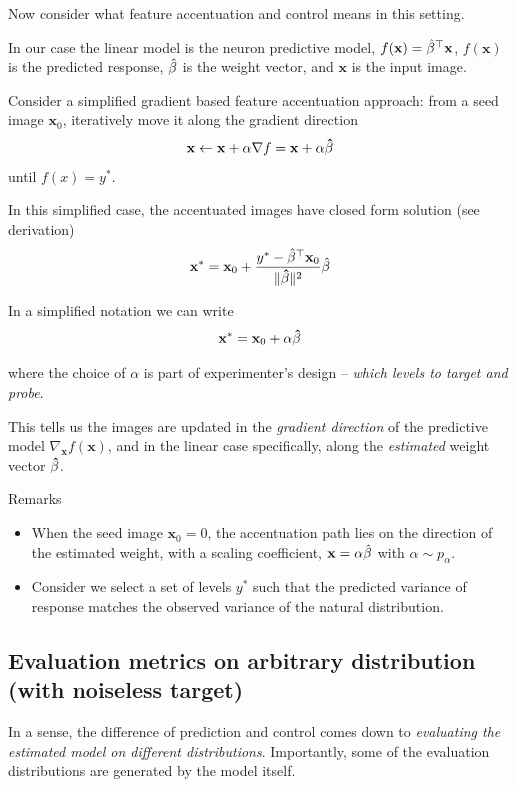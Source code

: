 Now consider what feature accentuation and control means in this setting.

In our case the linear model is the neuron predictive model, $f(\mathbf{x})={\hat{\beta}}^{\top}\mathbf{x}$,
$f(\mathbf{x})$ is the predicted response, $\hat{\beta}$ is the
weight vector, and $\mathbf{x}$ is the input image.

Consider a simplified gradient based feature accentuation approach:
from a seed image $\mathbf{x}_{0}$, iteratively move it along the
gradient direction
\[
\mathbf{x}\gets\mathbf{x}+\alpha\nabla f=\mathbf{x}+\alpha\mathbf{\hat{\beta}}
\]
 until $f(x)=y^{*}$.

In this simplified case, the accentuated images have closed form solution
(see derivation)
\[
\mathbf{x}^{*}=\mathbf{x}_{0}+\frac{y^{*}-{\hat{\beta}}^{\top}\mathbf{x}_{0}}{\|\mathbf{\hat{\beta}}\|^{2}}\hat{\beta}
\]

In a simplified notation we can write
\[
\mathbf{x}^{*}=\mathbf{x}_{0}+\alpha\mathbf{\hat{\beta}}
\]

where the choice of $\alpha$ is part of experimenter's design --
\emph{which levels to target and probe}.

This tells us the images are updated in the \emph{gradient direction}
of the predictive model $\nabla_{\mathbf{x}}f(\mathbf{x})$, and in
the linear case specifically, along the \emph{estimated} weight vector
$\mathbf{\hat{\beta}}$.

Remarks
\begin{itemize}
\item When the seed image $\mathbf{x}_{0}=0$, the accentuation path lies
on the direction of the estimated weight, with a scaling coefficient,
$\mathbf{x}=\alpha\hat{\beta}$ with $\alpha\sim p_{\alpha}$.
\item Consider we select a set of levels $y^{*}$ such that the predicted
variance of response matches the observed variance of the natural
distribution.
\end{itemize}


\subsection{Evaluation metrics on arbitrary distribution (with noiseless target)}

In a sense, the difference of prediction and control comes down to
\emph{evaluating the estimated model on different distributions}.
Importantly, some of the evaluation distributions are generated by
the model itself.

